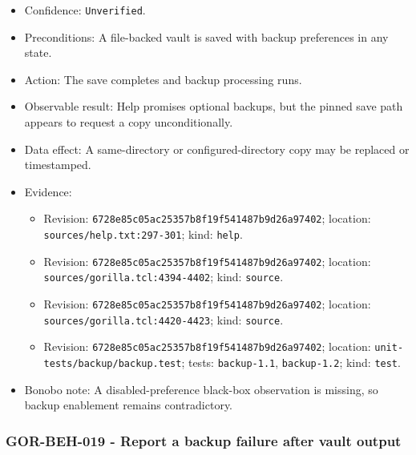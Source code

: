 \documentclass[
  letterpaper,
]{article}
\newcommand{\passthrough}[1]{#1}
\providecommand{\tightlist}{%
  \setlength{\itemsep}{0pt}\setlength{\parskip}{0pt}}
\begin{document}
\begin{itemize}
\tightlist
\item
  Confidence: \nolinkurl{Unverified}.
\item
  Preconditions: A file-backed vault is saved with backup preferences in any state.
\item
  Action: The save completes and backup processing runs.
\item
  Observable result: Help promises optional backups, but the pinned save path appears to request a copy unconditionally.
\item
  Data effect: A same-directory or configured-directory copy may be replaced or timestamped.
\item
  Evidence:

  \begin{itemize}
  \tightlist
  \item
    Revision: \nolinkurl{6728e85c05ac25357b8f19f541487b9d26a97402}; location: \nolinkurl{sources/help.txt:297-301};
    kind: \passthrough{\lstinline!help!}.
  \item
    Revision: \nolinkurl{6728e85c05ac25357b8f19f541487b9d26a97402}; location: \nolinkurl{sources/gorilla.tcl:4394-4402};
    kind: \passthrough{\lstinline!source!}.
  \item
    Revision: \nolinkurl{6728e85c05ac25357b8f19f541487b9d26a97402}; location: \nolinkurl{sources/gorilla.tcl:4420-4423};
    kind: \passthrough{\lstinline!source!}.
  \item
    Revision: \nolinkurl{6728e85c05ac25357b8f19f541487b9d26a97402}; location: \nolinkurl{unit-tests/backup/backup.test};
    tests: \nolinkurl{backup-1.1}, \nolinkurl{backup-1.2}; kind: \passthrough{\lstinline!test!}.
  \end{itemize}
\item
  Bonobo note: A disabled-preference black-box observation is missing, so backup enablement remains contradictory.
\end{itemize}

\subsubsection{GOR-BEH-019 - Report a backup failure after vault
output}\label{gor-beh-019---report-a-backup-failure-after-vault-output}
\end{document}
